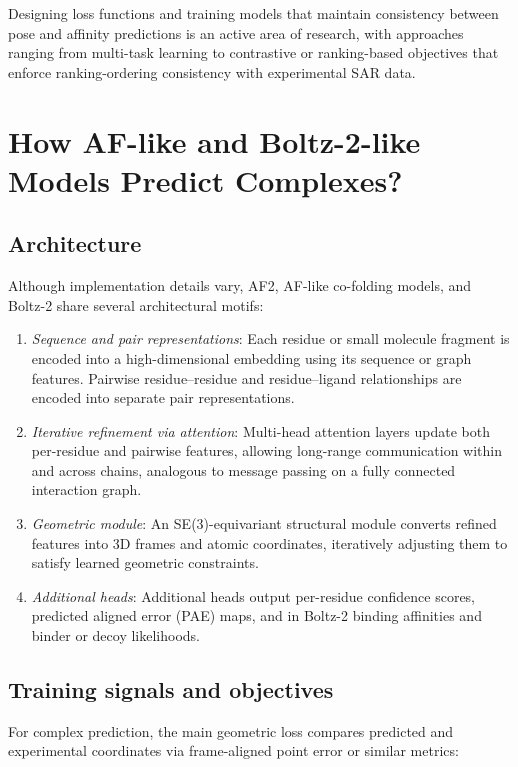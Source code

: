 \documentclass[12pt]{article}
\begin{document}
Designing loss functions and training models that maintain consistency between pose and affinity predictions is an active area of research, with approaches ranging from multi-task learning to contrastive or ranking-based objectives that enforce ranking-ordering consistency with experimental SAR data\cite{CH13_shen2023generalized,CH13_durant2025robustly}.

\section{How AF-like and Boltz-2-like Models Predict Complexes?}

\subsection{Architecture}

Although implementation details vary, AF2\cite{CH13_jumper2021alphafold}, AF-like co-folding models\cite{CH13_alphafoldreview2021,CH13_proteinpredictionuntilcasp15}, and Boltz-2\cite{CH13_passaro2025boltz2} share several architectural motifs:
\begin{enumerate}
  \item \emph{Sequence and pair representations}: Each residue or small molecule fragment is encoded into a high-dimensional embedding using its sequence or graph features. Pairwise residue–residue and residue–ligand relationships are encoded into separate pair representations.
  \item \emph{Iterative refinement via attention}: Multi-head attention layers update both per-residue and pairwise features, allowing long-range communication within and across chains, analogous to message passing on a fully connected interaction graph.
  \item \emph{Geometric module}: An SE(3)-equivariant structural module converts refined features into 3D frames and atomic coordinates, iteratively adjusting them to satisfy learned geometric constraints.
  \item \emph{Additional heads}: Additional heads output per-residue confidence scores, predicted aligned error (PAE) maps, and in Boltz-2 binding affinities and binder or decoy likelihoods.
\end{enumerate}

\subsection{Training signals and objectives}
For complex prediction, the main geometric loss compares predicted and experimental coordinates via frame-aligned point error or similar metrics:
\end{document}
